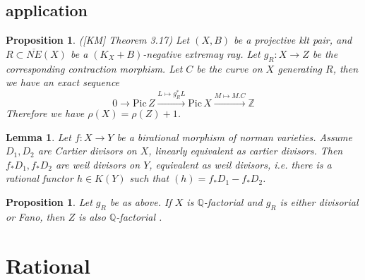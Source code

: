 \documentclass{article}
\newtheorem{prop}[defn]{Proposition}
\newtheorem{lem}[defn]{Lemma}
\begin{document}
\subsection{application}
\begin{prop}
  ([KM] Theorem 3.17) Let $ (X,B) $ be a projective klt pair, and $ R\subset \overline{NE}(X) $ be a $ (K_X+B) $-negative extremay ray. Let $ g_R:X\to Z $ be the corresponding contraction morphism. Let $ C $ be the curve on $ X $ generating $ R $, then we have an exact sequence
  \[ 0\to \mathrm{Pic}\,Z\xrightarrow{L\mapsto g_R^*L}\mathrm{Pic}\,X\xrightarrow{M\mapsto M.C} \mathbb{Z} \]
  Therefore we have $ \rho(X)=\rho(Z)+1 $. 
\end{prop}
\begin{lem}
  Let $ f:X\to Y $ be a birational morphism of norman varieties. Assume $ D_1,D_2 $ are  Cartier divisors on $ X $, linearly equivalent as cartier divisors. Then $ f_*D_1,f_*D_2 $ are weil divisors on $ Y $, equivalent as weil divisors, i.e. there is a rational functor $ h\in K(Y) $ such that $ (h)= f_*D_1-f_*D_2$.
\end{lem}

\begin{prop}
  Let $ g_R $ be as above. If $ X $ is $ \mathbb{Q} $-factorial and $ g_R $ is either divisorial or Fano, then $ Z $ is also   $\mathbb{Q} $-factorial .
\end{prop}
\section{Rational}
\end{document}
